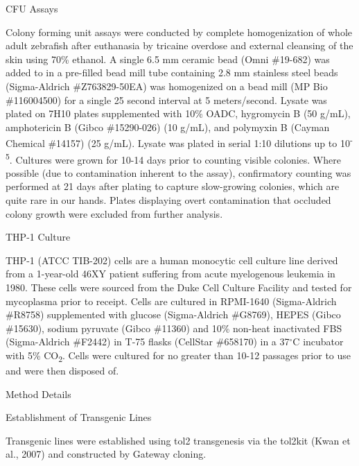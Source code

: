 CFU Assays

Colony forming unit assays were conducted by complete homogenization of whole adult zebrafish after euthanasia by tricaine overdose and external cleansing of the skin using 70\% ethanol. A single 6.5 mm ceramic bead (Omni \#19-682) was added to in a pre-filled bead mill tube containing 2.8 mm stainless steel beads (Sigma-Aldrich \#Z763829-50EA) was homogenized on a bead mill (MP Bio \#116004500) for a single 25 second interval at 5 meters/second. Lysate was plated on 7H10 plates supplemented with 10\% OADC,  hygromycin B (50 \textmu g/mL), amphotericin B (Gibco \#15290-026) (10 \textmu g/mL), and polymyxin B (Cayman Chemical \#14157) (25 \textmu g/mL). Lysate was plated in serial 1:10 dilutions up to 10\textsuperscript{-5}. Cultures were grown for 10-14 days prior to counting visible colonies. Where possible (due to contamination inherent to the assay), confirmatory counting was performed at 21 days after plating to capture slow-growing colonies, which are quite rare in our hands. Plates displaying overt contamination that occluded colony growth were excluded from further analysis.



THP-1 Culture

THP-1 (ATCC TIB-202) cells are a human monocytic cell culture line derived from a 1-year-old 46XY patient suffering from acute myelogenous leukemia in 1980. These cells were sourced from the Duke Cell Culture Facility and tested for mycoplasma prior to receipt. Cells are cultured in RPMI-1640 (Sigma-Aldrich \#R8758) supplemented with glucose (Sigma-Aldrich \#G8769), HEPES (Gibco \#15630), sodium pyruvate (Gibco \#11360) and 10\% non-heat inactivated FBS (Sigma-Aldrich \#F2442) in T-75 flasks (CellStar \#658170) in a 37$^{\circ}$C incubator with 5\% CO\textsubscript{2}. Cells were cultured for no greater than 10-12 passages prior to use and were then disposed of.

Method Details




Establishment of Transgenic Lines

Transgenic lines were established using tol2 transgenesis via the tol2kit (Kwan et al., 2007) and constructed by Gateway cloning. 

